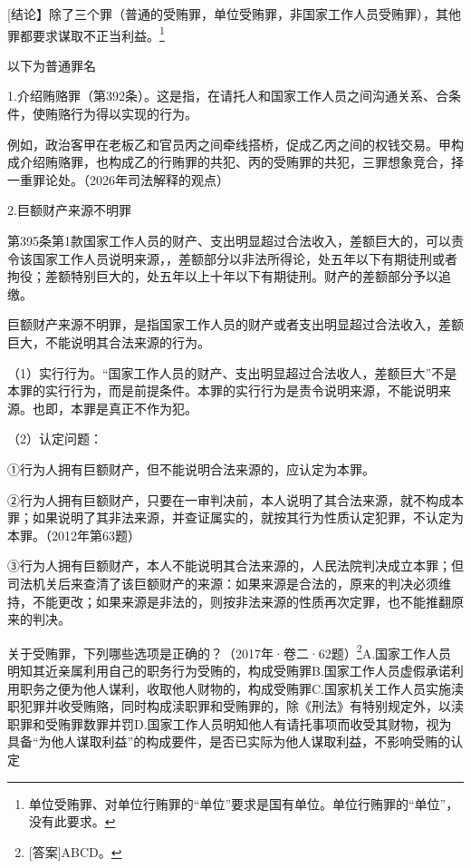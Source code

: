 [结论】除了三个罪（普通的受贿罪，单位受贿罪，非国家工作人员受贿罪），其他罪都要求谋取不正当利益。\footnote{单位受贿罪、对单位行贿罪的“单位”要求是国有单位。单位行贿罪的“单位”，没有此要求。}

以下为普通罪名

1.介绍贿赂罪（第392条）。这是指，在请托人和国家工作人员之间沟通关系、合条件，使贿赂行为得以实现的行为。

例如，政治客甲在老板乙和官员丙之间牵线搭桥，促成乙丙之间的权钱交易。甲构成介绍贿赂罪，也构成乙的行贿罪的共犯、丙的受贿罪的共犯，三罪想象竞合，择一重罪论处。（2026年司法解释的观点）

2.巨额财产来源不明罪

第395条第1款国家工作人员的财产、支出明显超过合法收入，差额巨大的，可以责令该国家工作人员说明来源，，差额部分以非法所得论，处五年以下有期徒刑或者拘役；差额特别巨大的，处五年以上十年以下有期徒刑。财产的差额部分予以追缴。

巨额财产来源不明罪，是指国家工作人员的财产或者支出明显超过合法收入，差额巨大，不能说明其合法来源的行为。

（1）实行行为。“国家工作人员的财产、支出明显超过合法收人，差额巨大”不是本罪的实行行为，而是前提条件。本罪的实行行为是责令说明来源，不能说明来源。也即，本罪是真正不作为犯。

（2）认定问题：

①行为人拥有巨额财产，但不能说明合法来源的，应认定为本罪。

②行为人拥有巨额财产，只要在一审判决前，本人说明了其合法来源，就不构成本罪；如果说明了其非法来源，并查证属实的，就按其行为性质认定犯罪，不认定为本罪。（2012年第63题）

③行为人拥有巨额财产，本人不能说明其合法来源的，人民法院判决成立本罪；但司法机关后来查清了该巨额财产的来源：如果来源是合法的，原来的判决必须维持，不能更改；如果来源是非法的，则按非法来源的性质再次定罪，也不能推翻原来的判决。


关于受贿罪，下列哪些选项是正确的？（2017年·卷二·62题）\footnote{[答案]ABCD。}A.国家工作人员明知其近亲属利用自己的职务行为受贿的，构成受贿罪B.国家工作人员虚假承诺利用职务之便为他人谋利，收取他人财物的，构成受贿罪C.国家机关工作人员实施渎职犯罪并收受贿赂，同时构成渎职罪和受贿罪的，除《刑法》有特别规定外，以渎职罪和受贿罪数罪并罚D.国家工作人员明知他人有请托事项而收受其财物，视为具备“为他人谋取利益”的构成要件，是否已实际为他人谋取利益，不影响受贿的认定

